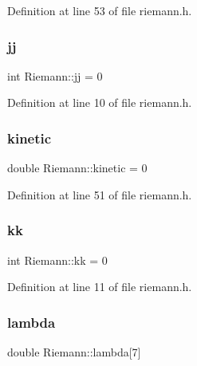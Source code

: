 Definition at line 53 of file riemann.\+h.

\mbox{\label{classRiemann_a704fc2f4433b345feef019aa74a9e6d9}} 
\subsubsection{\texorpdfstring{jj}{jj}}
{\footnotesize\ttfamily int Riemann\+::jj = 0\hspace{0.3cm}{\ttfamily [private]}}



Definition at line 10 of file riemann.\+h.

\mbox{\label{classRiemann_a90e80239e22cc2fa3bc2924fadb27001}} 
\subsubsection{\texorpdfstring{kinetic}{kinetic}}
{\footnotesize\ttfamily double Riemann\+::kinetic = 0\hspace{0.3cm}{\ttfamily [private]}}



Definition at line 51 of file riemann.\+h.

\mbox{\label{classRiemann_ad155872df64f6464e75672b0fd263f94}} 
\subsubsection{\texorpdfstring{kk}{kk}}
{\footnotesize\ttfamily int Riemann\+::kk = 0\hspace{0.3cm}{\ttfamily [private]}}



Definition at line 11 of file riemann.\+h.

\mbox{\label{classRiemann_a5075d160fbae78a0c6204385033f6891}} 
\subsubsection{\texorpdfstring{lambda}{lambda}}
{\footnotesize\ttfamily double Riemann\+::lambda\mbox{[}7\mbox{]}\hspace{0.3cm}{\ttfamily [private]}}



